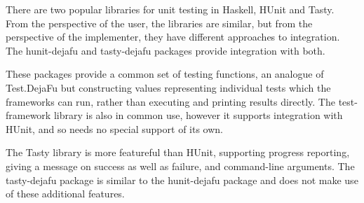 There are two popular libraries for unit testing in Haskell,
HUnit\cite{hunit} and Tasty\cite{tasty}.  From the perspective of the
user, the libraries are similar, but from the perspective of the
implementer, they have different approaches to integration.  The
hunit-dejafu\cite{hunit_dejafu} and tasty-dejafu\cite{tasty_dejafu}
packages provide integration with both.

These packages provide a common set of testing functions, an analogue
of Test.DejaFu but constructing values representing individual tests
which the frameworks can run, rather than executing and printing
results directly.  The test-framework\cite{test_framework} library is
also in common use, however it supports integration with HUnit, and so
needs no special support of its own.

The Tasty library is more featureful than HUnit, supporting progress
reporting, giving a message on success as well as failure, and
command-line arguments.  The tasty-dejafu package is similar to the
hunit-dejafu package and does not make use of these additional
features.





